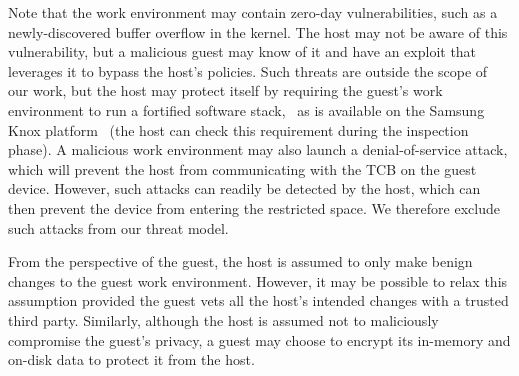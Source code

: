 Note that the work environment may contain zero-day vulnerabilities, such as a
newly-discovered buffer overflow in the kernel. The host may not be aware of
this vulnerability, but a malicious guest may know of it and have an exploit
that leverages it to bypass the host's policies.  Such threats are outside the
scope of our work, but the host may protect itself by requiring the guest's
work environment to run a fortified software stack, \eg~as is available on the
Samsung Knox platform~\cite{knox:ccs14} (the host can check this requirement
during the inspection phase). A malicious work environment may also launch a
denial-of-service attack, which will prevent the host from communicating with
the TCB on the guest device. However, such attacks can readily be detected by
the host, which can then prevent the device from entering the restricted space.
We therefore exclude such attacks from our threat model.

From the perspective of the guest, the host is assumed to only make benign
changes to the guest work environment. However, it may be possible to relax
this assumption provided the guest vets all the host's intended changes with 
a trusted third party. Similarly, although the host is assumed not to
maliciously compromise the guest's privacy, a guest may choose to encrypt its
in-memory and on-disk data to protect it from the host.









